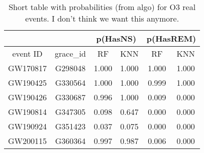 \begin{table}[]
\begin{tabular}{c|c|cc|cc}
\hline
\multicolumn{1}{c|}{}         & \multicolumn{1}{l|}{} & \multicolumn{2}{c|}{p(HasNS)}                                                & \multicolumn{2}{c}{p(HasREM)}                                                \\ \hline
\multicolumn{1}{c|}{event ID} & grace\_id             & \multicolumn{1}{c}{RF} & \multicolumn{1}{c}{KNN}  & \multicolumn{1}{c}{RF} & \multicolumn{1}{c}{KNN} \\ \hline
GW170817                      & G298048               & 1.000                   & 1.000                    & 1.000                   & 1.000                                  \\
GW190425                      & G330564               & 1.000                   & 1.000                    & 0.999                   & 1.000                             \\
GW190426                      & G330687               & 0.996                   & 1.000                    & 0.009                   & 0.000                     \\
GW190814                      & G347305               & 0.098                   & 0.647                    & 0.000                   & 0.000                      \\
GW190924                      & G351423               & 0.037                   & 0.075                    & 0.000                   & 0.000                       \\               
GW200115                      & G360364               & 0.997                   & 0.987                   & 0.006                   & 0.000                           \\
\hline
\end{tabular}
\caption{Short table with probabilities (from algo) for O3 real events. I don't think we want this anymore.}
\label{tab:real_data_short}
\end{table}

